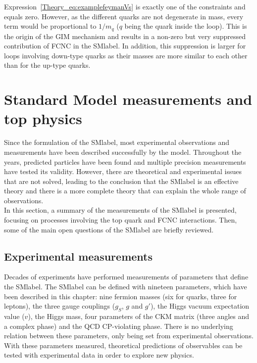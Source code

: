 Expression~\ref{Theory_eq:examplefeymanVs} is exactly one of the constraints and equals zero.  However, as the different quarks are not degenerate in mass, every term would be proportional to $1/m_q$ ($q$ being the quark inside the loop). This is the origin of the GIM mechanism and results in a non-zero but very suppressed contribution of FCNC in the \acrshort{SMlabel}. In addition, this suppression is larger for loops involving down-type quarks as their masses are more similar to each other than for the up-type quarks.

\section{Standard Model measurements and top physics}

Since the formulation of the \acrshort{SMlabel}, most experimental observations and measurements have been described successfully by the model. Throughout the years, predicted particles have been found and multiple precision measurements have tested its validity. However, there are theoretical and experimental issues that are not solved, leading to the conclusion that the \acrshort{SMlabel} is an effective theory and there is a more complete theory that can explain the whole range of observations.\\

In this section, a summary of the measurements of the \acrshort{SMlabel} is presented, focusing on processes involving the top quark and FCNC interactions. Then, some of the main open questions of the \acrshort{SMlabel} are briefly reviewed.

\subsection{Experimental measurements}

Decades of experiments have performed measurements of parameters that define the \acrshort{SMlabel}. The \acrshort{SMlabel} can be defined with nineteen parameters, which have been described in this chapter: nine fermion masses (six for quarks, three for leptons), the three gauge couplings ($g_S$, $g$ and $g'$), the Higgs vacuum expectation value ($v$), the Higgs mass, four parameters of the CKM matrix (three angles and a complex phase) and the \acrshort{QCD} CP-violating phase. There is no underlying relation between these parameters, only being set from experimental observations. With these parameters measured, theoretical predictions of observables can be tested with experimental data in order to explore new physics.\\

